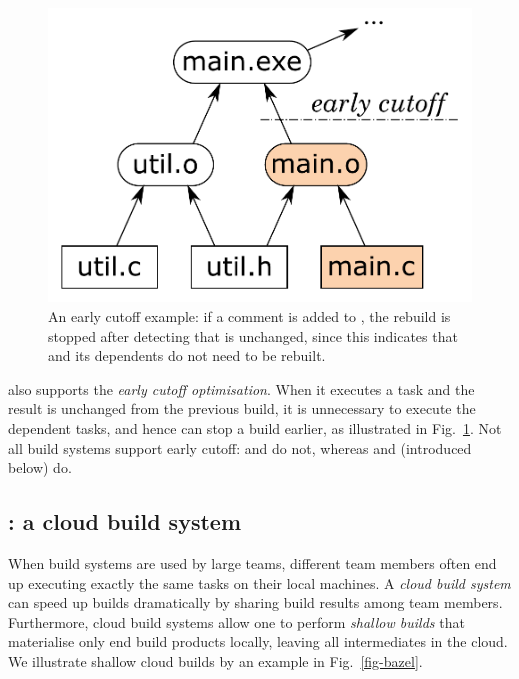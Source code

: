 \begin{figure}[h]
\vspace{-5mm}
\centerline{\includegraphics[scale=0.28]{fig/shake-example-cutoff.pdf}}
\vspace{-3mm}
\caption{An early cutoff example: if a comment is added to , the
rebuild is stopped after detecting that  is unchanged, since this
indicates that  and its dependents do not need to be
rebuilt.\label{fig-cutoff}}
\vspace{-2mm}
\end{figure}

\Shake also supports the \emph{early cutoff optimisation}. When it
executes a task and the result is unchanged from the previous build, it is
unnecessary to execute the dependent tasks, and hence \Shake can stop a build
earlier, as illustrated in Fig.~\ref{fig-cutoff}. Not all build systems support
early cutoff: \Make and \Excel do not, whereas \Shake and \Bazel (introduced
below) do.

\subsection{\Bazel: a cloud build system}
\label{sec-background-bazel}

When build systems are used by large teams, different team members often end up
executing exactly the same tasks on their local machines. A \emph{cloud build
system} can speed up builds dramatically by sharing build results
among team members. Furthermore, cloud build systems allow one to perform
\emph{shallow builds} that materialise only end build products locally, leaving
all intermediates in the cloud. We illustrate shallow cloud builds by an example
in Fig.~\ref{fig-bazel}.

